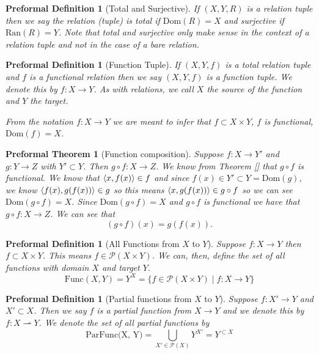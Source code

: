 \documentclass[oneside, 12pt]{book}
\theoremstyle{break}
\newtheorem{preformal definition}[definition]{Preformal Definition}
\newtheorem{preformal theorem}[theorem]{Preformal Theorem}
\newcommand{\mc}[1]{\mathcal{#1}}
\begin{document}
			\begin{preformal definition}[Total and Surjective]
				If $(X, Y, R)$ is a relation tuple then we say the relation (tuple) is total if $\text{Dom}(R) = X$ and surjective if $\text{Ran}(R) = Y$.
				Note that total and surjective only make sense in the context of a relation \textit{tuple} and not in the case of a bare relation. 
			\end{preformal definition}
			
			\begin{preformal definition}[Function Tuple]
				If $(X, Y, f)$ is a total relation tuple and $f$ is a functional relation then we say $(X, Y, f)$ is a function tuple.
				We denote this by $f:X\to Y$.
				As with relations, we call $X$ the source of the function and $Y$ the target.
				
				From the notation $f: X\to Y$ we are meant to infer that $f\subset X\times Y$, $f$ is functional, $\text{Dom}(f) = X$.
			\end{preformal definition}
			
			\begin{preformal theorem}[Function composition]
				Suppose $f: X \to Y'$ and $g: Y \to Z$ with $Y' \subset Y$.
				Then $g \circ f: X \to Z$.
				We know from Theorem \ref{} that $g\circ f$ is functional.
				We know that $\braket{x, f(x)} \in f$ and since $f(x) \in Y' \subset Y= \text{Dom}(g)$, we know $\braket{f(x), g(f(x))} \in g$ so this means $\braket{x, g(f(x))} \in g\circ f$ so we can see $\text{Dom}(g\circ f) = X$. Since $\text{Dom}(g \circ f) = X$ and $g\circ f$ is functional we have that $g\circ f: X \to Z$.
				We can see that
				\begin{equation*}
					(g\circ f)(x) = g(f(x)).
				\end{equation*}
			\end{preformal theorem}
			
			\begin{preformal definition}[All Functions from $X$ to $Y$]
				Suppose $f:X\to Y$ then $f\subset X\times Y$. 
				This means $f\in \mc{P}(X\times Y)$.
				We can, then, define the set of all functions with domain $X$ and target $Y$.
				$$
				\text{Func}(X, Y) = Y^X = \{f \in \mc{P}(X\times Y) \mid f: X \to Y\}
				$$				
			\end{preformal definition}
			
			\begin{preformal definition}[Partial functions from $X$ to $Y$]
				Suppose $f: X' \to Y$ and $X' \subset X$. 
				Then we say $f$ is a partial function from $X \to Y$ and we denote this by $f:X\rightharpoonup Y$.
				We denote the set of all partial functions by
				\begin{equation*}
					\text{ParFunc(X, Y)} = \bigcup_{X' \in \mc{P}(X)} Y^{X'} = Y^{\subset X}
				\end{equation*}
			\end{preformal definition}
	
\end{document}
